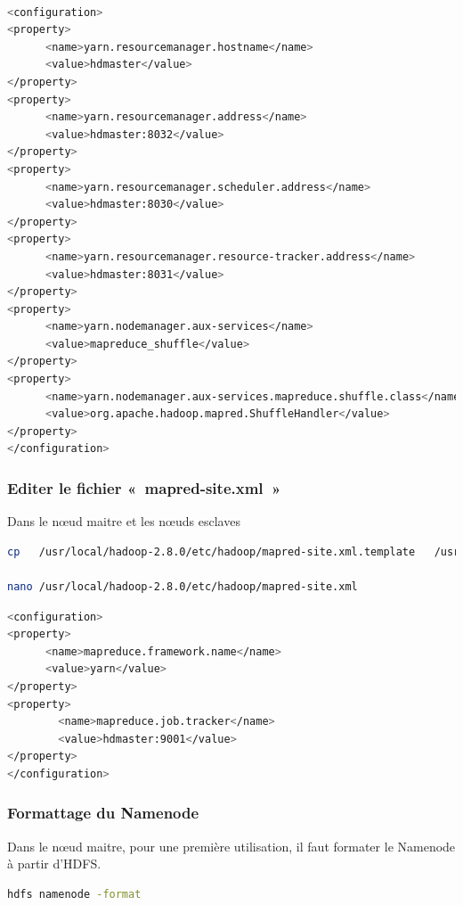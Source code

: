 \documentclass[12pt,french]{book}
\begin{document}
\begin{lstlisting}[language=bash, frame=single]

<configuration>
<property>
      <name>yarn.resourcemanager.hostname</name>
      <value>hdmaster</value>
</property>
<property>
      <name>yarn.resourcemanager.address</name>
      <value>hdmaster:8032</value>
</property>
<property>
      <name>yarn.resourcemanager.scheduler.address</name>
      <value>hdmaster:8030</value>
</property>
<property>
      <name>yarn.resourcemanager.resource-tracker.address</name>
      <value>hdmaster:8031</value>
</property>
<property>
      <name>yarn.nodemanager.aux-services</name>
      <value>mapreduce_shuffle</value>
</property>
<property>
      <name>yarn.nodemanager.aux-services.mapreduce.shuffle.class</name>
      <value>org.apache.hadoop.mapred.ShuffleHandler</value>
</property>
</configuration>
\end{lstlisting}

\subsubsection{Editer le fichier « mapred-site.xml »}

Dans le nœud maitre et les nœuds esclaves

\begin{lstlisting}[language=bash, frame=single]
cp   /usr/local/hadoop-2.8.0/etc/hadoop/mapred-site.xml.template   /usr/local/hadoop-2.8.0/etc/hadoop/mapred-site.xml

nano /usr/local/hadoop-2.8.0/etc/hadoop/mapred-site.xml
\end{lstlisting}

\begin{lstlisting}[language=bash, frame=single]
<configuration>
<property>
      <name>mapreduce.framework.name</name>
      <value>yarn</value>
</property>
<property>
        <name>mapreduce.job.tracker</name>
        <value>hdmaster:9001</value>
</property>
</configuration>
\end{lstlisting}

\subsubsection{Formattage du Namenode}

Dans le nœud maitre, pour une première utilisation, il faut formater le Namenode à partir d’HDFS.


\begin{lstlisting}[language=bash, frame=single]
hdfs namenode -format
\end{lstlisting}
\end{document}
